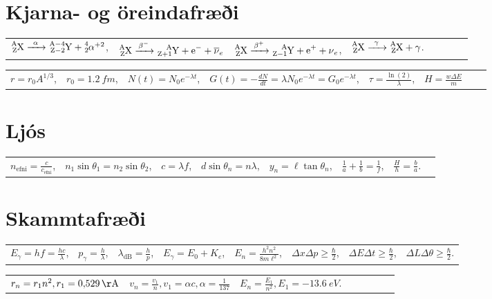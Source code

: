 \section*{Kjarna- og öreindafræði}

\begin{table}[H]
\begin{tabular}{llllllll}
$\ce{^{A}_{Z}X ->[\alpha] ^{A-4}_{Z-2}Y + ^{4}_{2}\alpha}^{+2}$, & $\ce{^{A}_{Z}X ->[\beta^-] ^{A}_{Z+1}Y + e^{-} + \overline{\nu}_e}$ & $\ce{^{A}_{Z}X ->[\beta^+] ^{A}_{Z-1}Y + e^{+} + \nu_e}$, & $\ce{^{A}_{Z}X ->[\gamma] ^{A}_{Z}X + \gamma}$.
\end{tabular}
\end{table}

\begin{table}[H]
\begin{tabular}{llllllll}
$r = r_0 A^{1/3}$, & $r_0 = \SI{1.2}{fm}$, & $N(t) = N_0e^{-\lambda t}$, & $G(t) = -\frac{dN}{dt} = \lambda N_0e^{-\lambda t} = G_0 e^{-\lambda t}$, & $\tau = \frac{\ln(2)}{\lambda}$, & $H = \frac{w\Delta E}{m}$
\end{tabular}
\end{table}


\section*{Ljós}

\begin{table}[H]
\begin{tabular}{llllllll}
$n_{\text{efni}} = \frac{c}{c_{\text{efni}}}$, & $n_1 \sin\theta_1 = n_2\sin\theta_2$, & $c = \lambda f$, & $d\sin\theta_n = n\lambda$, & $y_n = \ell \tan\theta_n$, & $\frac{1}{a} + \frac{1}{b} = \frac{1}{f}$, & $\frac{H}{h} = \frac{b}{a}$. 
\end{tabular}
\end{table}

\section*{Skammtafræði}

\begin{table}[H]
\begin{tabular}{llllllll}
$E_{\gamma} = hf = \frac{hc}{\lambda}$, & $p_{\gamma} = \frac{h}{\lambda}$, & $\lambda_{\text{dB}} = \frac{h}{p}$, & $E_\gamma = E_0 + K_e$, & $E_n = \frac{h^2 n^2}{8m\ell^2}$, & $\Delta x \Delta p \geq \frac{\hbar}{2}$, &  $\Delta E \Delta t \geq \frac{\hbar}{2}$, & $\Delta L \Delta \theta \geq \frac{\hbar}{2}$.
\end{tabular}
\end{table}

\begin{table}[H]
\begin{tabular}{llllllll}
$r_n = r_1 n^2, r_1 = \SI{0.529}{\AA}$ & $v_n = \frac{v_1}{n}, v_1 = \alpha c, \alpha = \frac{1}{137}$ & $E_n = \frac{E_1}{n^2}, E_1 = -\SI{13.6}{eV}$.
\end{tabular}
\end{table}